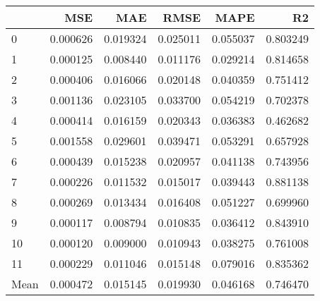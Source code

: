 \begin{tabular}{lrrrrr}
\toprule
 & MSE & MAE & RMSE & MAPE & R2 \\
\midrule
0 & 0.000626 & 0.019324 & 0.025011 & 0.055037 & 0.803249 \\
1 & 0.000125 & 0.008440 & 0.011176 & 0.029214 & 0.814658 \\
2 & 0.000406 & 0.016066 & 0.020148 & 0.040359 & 0.751412 \\
3 & 0.001136 & 0.023105 & 0.033700 & 0.054219 & 0.702378 \\
4 & 0.000414 & 0.016159 & 0.020343 & 0.036383 & 0.462682 \\
5 & 0.001558 & 0.029601 & 0.039471 & 0.053291 & 0.657928 \\
6 & 0.000439 & 0.015238 & 0.020957 & 0.041138 & 0.743956 \\
7 & 0.000226 & 0.011532 & 0.015017 & 0.039443 & 0.881138 \\
8 & 0.000269 & 0.013434 & 0.016408 & 0.051227 & 0.699960 \\
9 & 0.000117 & 0.008794 & 0.010835 & 0.036412 & 0.843910 \\
10 & 0.000120 & 0.009000 & 0.010943 & 0.038275 & 0.761008 \\
11 & 0.000229 & 0.011046 & 0.015148 & 0.079016 & 0.835362 \\
Mean & 0.000472 & 0.015145 & 0.019930 & 0.046168 & 0.746470 \\
\bottomrule
\end{tabular}
